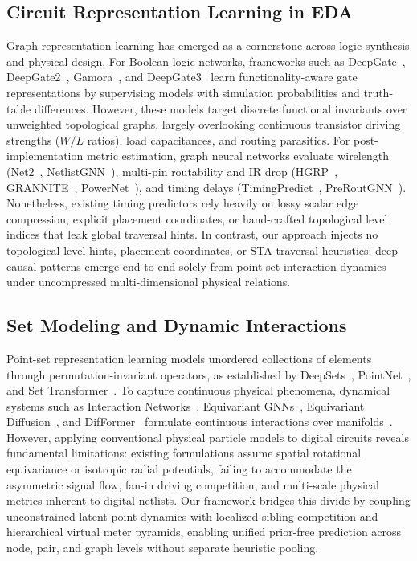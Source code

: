 \subsection{Circuit Representation Learning in EDA}
Graph representation learning has emerged as a cornerstone across logic synthesis and physical design. For Boolean logic networks, frameworks such as DeepGate~\cite{deepgate2022}, DeepGate2~\cite{deepgate2}, Gamora~\cite{gamora}, and DeepGate3~\cite{deepgate3} learn functionality-aware gate representations by supervising models with simulation probabilities and truth-table differences. However, these models target discrete functional invariants over unweighted topological graphs, largely overlooking continuous transistor driving strengths ($W/L$ ratios), load capacitances, and routing parasitics. For post-implementation metric estimation, graph neural networks evaluate wirelength (Net2~\cite{net2}, NetlistGNN~\cite{netlistgnn}), multi-pin routability and IR drop (HGRP~\cite{hgrp}, GRANNITE~\cite{grannite}, PowerNet~\cite{powernet}), and timing delays (TimingPredict~\cite{timingpredict}, PreRoutGNN~\cite{preroutgnn}). Nonetheless, existing timing predictors rely heavily on lossy scalar edge compression, explicit placement coordinates, or hand-crafted topological level indices that leak global traversal hints. In contrast, our approach injects no topological level hints, placement coordinates, or STA traversal heuristics; deep causal patterns emerge end-to-end solely from point-set interaction dynamics under uncompressed multi-dimensional physical relations.

\subsection{Set Modeling and Dynamic Interactions}
Point-set representation learning models unordered collections of elements through permutation-invariant operators, as established by DeepSets~\cite{zaheer2017deepsets}, PointNet~\cite{qi2017pointnet}, and Set Transformer~\cite{lee2019set}. To capture continuous physical phenomena, dynamical systems such as Interaction Networks~\cite{battaglia2016interaction}, Equivariant GNNs~\cite{satorras2021en}, Equivariant Diffusion~\cite{hoogeboom2022equivariant}, and DifFormer~\cite{wu2023difformer} formulate continuous interactions over manifolds~\cite{ramesh2023orbit,bodnar2024weisfeiler}. However, applying conventional physical particle models to digital circuits reveals fundamental limitations: existing formulations assume spatial rotational equivariance or isotropic radial potentials, failing to accommodate the asymmetric signal flow, fan-in driving competition, and multi-scale physical metrics inherent to digital netlists. Our framework bridges this divide by coupling unconstrained latent point dynamics with localized sibling competition and hierarchical virtual meter pyramids, enabling unified prior-free prediction across node, pair, and graph levels without separate heuristic pooling.

